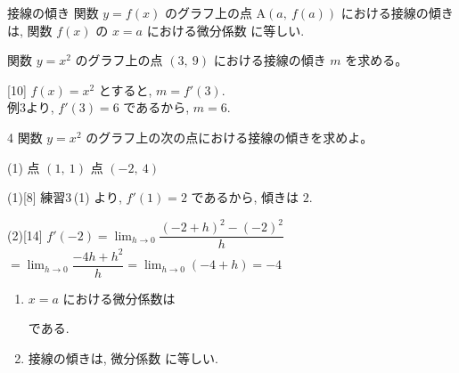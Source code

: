 \documentclass[14pt,dvipdfmx]{jsarticle}
\begin{document}
\vspace{0.5em}
\begin{definitionbox}{接線の傾き}
  関数 $y=f(x)$ のグラフ上の点 $\mathrm{A}(a,\ f(a))$ における接線の傾きは,
  関数 $f(x)$ の $x=a$ における微分係数  に等しい.
\end{definitionbox}

\vfill
\nextpage

\vspace{-1.4zw}%
\quad
関数 $y=x^{2}$ のグラフ上の点 $(3,\ 9)$ における接線の傾き $m$ を求める。

\vspace{0.15em}
\begin{answerbox}{}[10]
  $f(x)=x^{2}$ とすると, $m=f'(3)$.\\[0.4em]
  例3より, $f'(3)=6$ であるから, $m=6$.
\end{answerbox}

\begin{practiceprob}{4}
  関数 $y=x^{2}$ のグラフ上の次の点における接線の傾きを求めよ。
  \begin{tasks}[label=(\arabic*), label-width=1.6zw, item-indent=2zw, after-item-skip=0.15em](1)
    \task 点 $(1,\ 1)$
    \task 点 $(-2,\ 4)$
  \end{tasks}
\end{practiceprob}
\vspace{-0.15em}
\begin{answerbox}{(1)}[8]
  練習3\,(1) より, $f'(1)=2$ であるから, 傾きは $2$.
\end{answerbox}
\begin{answerbox}{(2)}[14]
  $f'(-2)=\lim_{h \to 0}\dfrac{(-2+h)^{2}-(-2)^{2}}{h}$\\[0.5em]
  $=\lim_{h \to 0}\dfrac{-4h+h^{2}}{h}=\lim_{h \to 0}(-4+h)=-4$
\end{answerbox}

\vfill
\begin{summarybox}
  \begin{enumerate}[label=\textbf{\arabic*}, leftmargin=1.5zw, itemsep=0.35em]
    \item $x=a$ における微分係数は
          \par\vspace{0.35em}
          {\renewcommand{\fitblankpad}{3zw}%
          }
          \mbox{である.}
    \item 接線の傾きは, 微分係数  に等しい.
  \end{enumerate}
\end{summarybox}

\vspace{0.4em}
\end{document}
